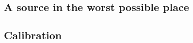 \documentclass{aa}
\begin{document}
\subsection{A source in the worst possible place}

\subsection{Calibration}



% 
% 
% 
% 
% 
% 
\end{document}
